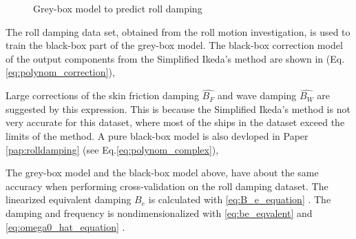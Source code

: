\begin{figure}[H]
    
    \centering
    \caption{Grey-box model to predict roll damping}
    \label{fig:greyrolldamping}
\end{figure}

\noindent The roll damping data set, obtained from the roll motion investigation, is used to train the black-box part of the grey-box model. The black-box correction model of the output components from the Simplified Ikeda's method are shown in (Eq.\ref{eq:polynom_correction}),


\noindent Large corrections of the skin friction damping $\hat{B_F}$ and wave damping $\hat{B_W}$ are suggested by this expression. This is because the Simplified Ikeda's method is not very accurate for this dataset, where most of the ships in the dataset exceed the limits of the method. A pure black-box model is also devloped in Paper \ref{pap:rolldamping} (see Eq.\ref{eq:polynom_complex}),


\noindent The grey-box model and the black-box model above, have about the same accuracy when performing cross-validation on the roll damping dataset. The linearized equivalent damping $B_e$ is calculated with \autoref{eq:B_e_equation} \cite{himeno_prediction_1981}. The damping and frequency is nondimensionalized with \autoref{eq:be_eqvalent} and \autoref{eq:omega0_hat_equation} \cite{himeno_prediction_1981}.

